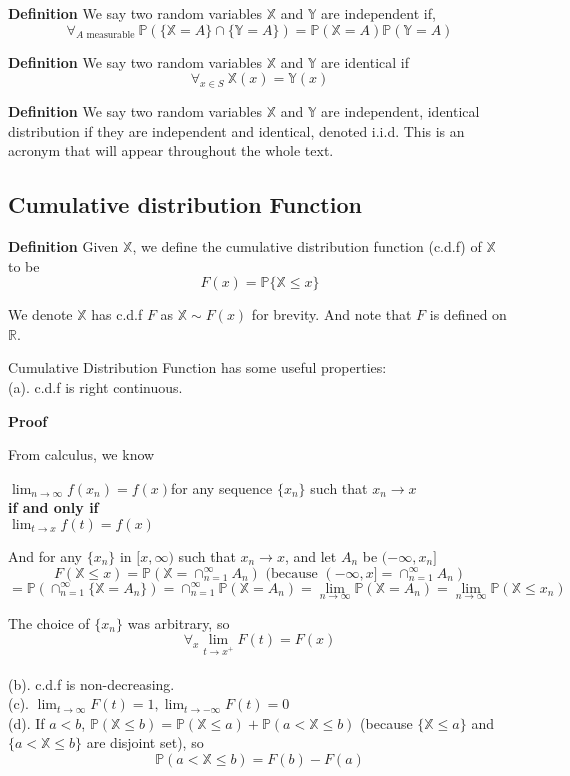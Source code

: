 \documentclass[a4paper,12pt]{article}
\begin{document}
\textbf{Definition} We say two random variables $\mathbb{X}$ and $\mathbb{Y}$ are independent if, $$\forall_{A\text{ measurable } }\mathbb{P}( \{\mathbb{X} = A\} \cap \{\mathbb{Y} = A\} ) = \mathbb{P}(\mathbb{X} = A)\mathbb{P}(\mathbb{Y} = A)$$

\textbf{Definition} We say two random variables $\mathbb{X}$ and $\mathbb{Y}$ are identical if $$\forall_{x\in S}\ \mathbb{X}(x) = \mathbb{Y}(x)$$

\textbf{Definition} We say two random variables $\mathbb{X}$ and $\mathbb{Y}$ are independent, identical distribution if they are independent and identical, denoted i.i.d. This is an acronym that will appear throughout the whole text.

\subsection{Cumulative distribution Function}

\textbf{Definition} Given $\mathbb{X}$, we define the cumulative distribution function (c.d.f) of $\mathbb{X}$ to be $$F(x) = \mathbb{P}\{\mathbb{X} \leq x\}$$

We denote $\mathbb{X}$ has c.d.f $F$ as $\mathbb{X} \sim F(x)$ for brevity. And note that $F$ is defined on $\mathbb{R}$.

Cumulative Distribution Function has some useful properties:\\
(a). c.d.f is right continuous.

\textbf{Proof}

From calculus, we know
\begin{center}
 $\lim_{n\to\infty}f(x_n)=f(x) $for any sequence $\{x_n\}$ such that $x_n \to x$\\ 
\textbf{if and only if}\\
 $\lim_{t\to x}f(t)=f(x)$
\end{center}
 
And for any $\{x_n\}$ in $[x, \infty )$ such that $x_n\to x$, and let $A_n$ be $(-\infty, x_n]$
$$F(\mathbb{X}\leq x) = \mathbb{P}( \mathbb{X} = \cap_{n=1}^\infty A_n )
 \text{\ \ \ (because   } (-\infty, x] = \cap_{n=1}^\infty A_n )$$
$$= \mathbb{P}(\cap_{n=1}^\infty\{\mathbb{X} = A_n \}) = \cap_{n=1}^\infty\mathbb{P}(\mathbb{X} = A_n ) = \lim_{n\to\infty}\mathbb{P}(\mathbb{X} = A_n ) = \lim_{n\to\infty}\mathbb{P}(\mathbb{X} \leq x_n )$$

The choice of $\{x_n\}$ was arbitrary, so $$\forall_x \lim_{t\to x^+}F(t) = F(x)$$\\
(b). c.d.f is non-decreasing.\\
(c). $\lim_{t\to \infty}F(t) = 1, \lim_{t\to -\infty}F(t) = 0$\\
(d). If $a<b$, $\mathbb{P}( \mathbb{X}\leq b ) = \mathbb{P}( \mathbb{X} \leq a ) + \mathbb{P}( a < \mathbb{X} \leq b )$ (because $\{\mathbb{X}\leq a\}$ and $\{a<\mathbb{X}\leq b\}$ are disjoint set), so $$\mathbb{P}( a < \mathbb{X} \leq b ) = F(b) - F(a)$$
\end{document}
